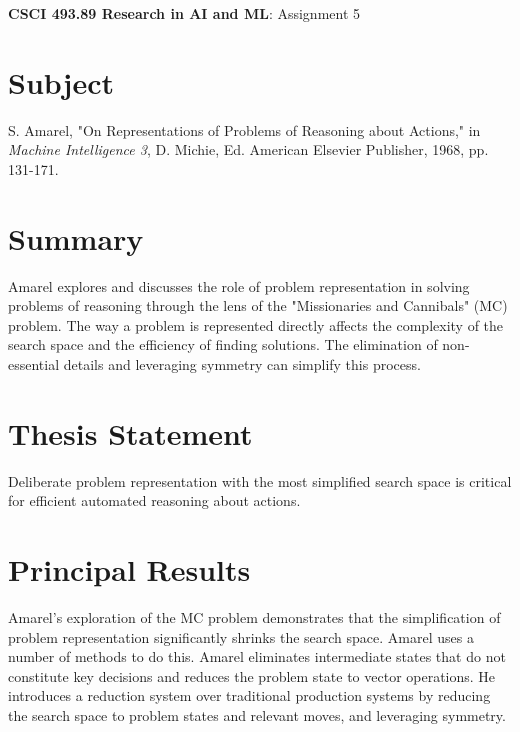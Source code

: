 \documentclass[12pt, letterpaper]{article}
\begin{document}
\pagestyle{empty}
\singlespacing
\vspace{1.0cm}

\newgeometry{} %

\textbf{CSCI 493.89 Research in AI and ML}: Assignment 5

\section{Subject}
\label{sec:subject}
S. Amarel, "On Representations of Problems of Reasoning about Actions," in \emph{Machine Intelligence 3}, D. Michie, Ed.    American Elsevier Publisher, 1968, pp. 131-171.

\section{Summary}
\label{sec:summary}
Amarel explores and discusses the role of problem representation in solving problems of reasoning through the lens of the "Missionaries and Cannibals" (MC) problem. The way a problem is represented directly affects the complexity of the search space and the efficiency of finding solutions. The elimination of non-essential details and leveraging symmetry can simplify this process.

\section{Thesis Statement}
\label{sec:thesis}
Deliberate problem representation with the most simplified search space is critical for efficient automated reasoning about actions. 

\section{Principal Results}
\label{sec:principal}
Amarel's exploration of the MC problem demonstrates that the simplification of problem representation significantly shrinks the search space. Amarel uses a number of methods to do this. Amarel eliminates intermediate states that do not constitute key decisions and reduces the problem state to vector operations. He introduces a reduction system over traditional production systems by reducing the search space to problem states and relevant moves, and leveraging symmetry. 
\end{document}
